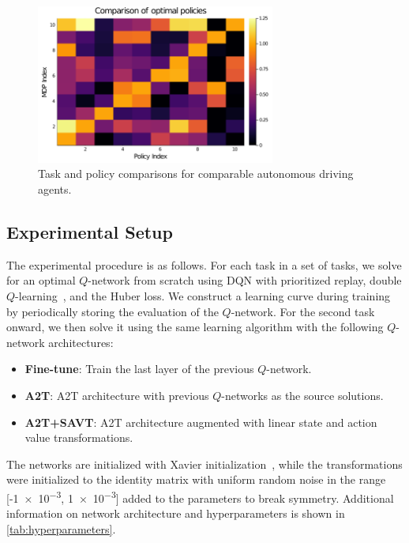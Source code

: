 \begin{figure}
    \centering
    \includegraphics[width=0.7\textwidth]{figures/iterative_validation/blindspot_heatmap_bigbatch.png}
    \caption{Task and policy comparisons for comparable autonomous driving agents.}
    \label{fig:ch7_comps_cad}
\end{figure}


\subsection{Experimental Setup}

The experimental procedure is as follows. For each task in a set of tasks, we solve for an optimal $Q$-network from scratch using DQN with prioritized replay, double $Q$-learning~\cite{Hasselt2016deep}, and the Huber loss. We construct a learning curve during training by periodically storing the evaluation of the $Q$-network. For the second task onward, we then solve it using the same learning algorithm with the following $Q$-network  architectures:
\begin{itemize}
    \item \textbf{Fine-tune}: Train the last layer of the previous $Q$-network.
    \item \textbf{A2T}: A2T architecture with previous $Q$-networks as the source solutions.
    \item \textbf{A2T+SAVT}:  A2T architecture augmented with linear state and action value transformations.
\end{itemize}
The networks are initialized with Xavier initialization~\cite{glorot2010understanding}, while the transformations were initialized to the identity matrix with uniform random noise  in the range [-\num{1e-3}, \num{1e-3}] added to the parameters to break symmetry. Additional information on network architecture and hyperparameters is shown in \cref{tab:hyperparameters}.


